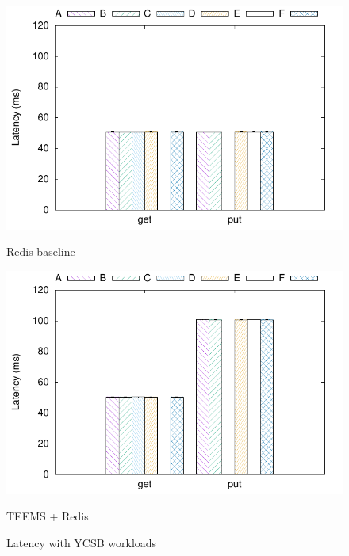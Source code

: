 \begin{figure}[t]
    \centering
    \begin{minipage}[t]{0.49\linewidth}
        \centering
        \includegraphics[width=\linewidth]{teem_results/deployment/result/ycsb_redis}
        \caption{Redis baseline}\label{fig:ycsb_redis}
    \end{minipage}
    \begin{minipage}[t]{0.49\linewidth}
        \centering
        \includegraphics[width=\linewidth]{teem_results/deployment/result/ycsb_teems}
        \caption{\ac{TEEMS} + Redis}\label{fig:ycsb_teems}
    \end{minipage}
    \caption{Latency with \ac{YCSB} workloads}
\end{figure}

